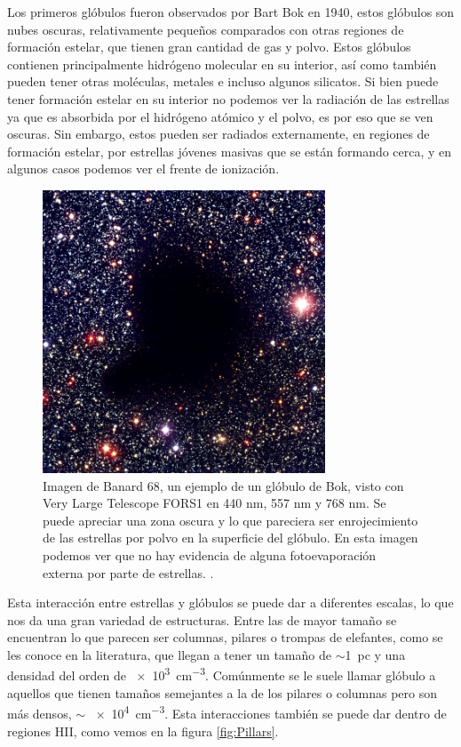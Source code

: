 \documentclass{book}
\begin{document}
Los primeros glóbulos fueron observados por Bart Bok en 1940, estos glóbulos son nubes oscuras, relativamente pequeños comparados con otras regiones de formación estelar, que tienen gran cantidad de gas y polvo. Estos glóbulos contienen principalmente hidrógeno molecular en su interior, así como también pueden tener otras moléculas, metales e incluso algunos silicatos. Si bien puede tener formación estelar en su interior no podemos ver la radiación de las estrellas ya que es absorbida por el hidrógeno atómico y el polvo, es por eso que se ven oscuras. Sin embargo, estos pueden ser radiados externamente, en regiones de formación estelar, por estrellas jóvenes masivas que se están formando cerca, y en algunos casos podemos ver el frente de ionización.

\begin{figure}[h!]
    \centering
    \includegraphics[width=0.75\textwidth]{images Chapter 1/C1_Bok_globule.jpg}
    \caption{Imagen de Banard 68, un ejemplo de un glóbulo de Bok, visto con Very Large Telescope FORS1 en 440 nm, 557 nm y 768 nm. Se puede apreciar una zona oscura y lo que pareciera ser enrojecimiento de las estrellas por polvo en la superficie del glóbulo. En esta imagen podemos ver que no hay evidencia de alguna fotoevaporación externa por parte de estrellas. \citep{Alves:2001}.}
    \label{fig:Banard}
\end{figure}

Esta interacción entre estrellas y glóbulos se puede dar a diferentes escalas, lo que nos da una gran variedad de estructuras. Entre las de mayor tamaño se encuentran lo que parecen ser columnas, pilares o trompas de elefantes, como se les conoce en la literatura, que llegan a tener un tamaño de $\sim$\SI{1}{pc} y una densidad del orden de \SI{e3}{cm^{-3}}. Comúnmente se le suele llamar glóbulo a aquellos que tienen tamaños semejantes a la de los pilares o columnas pero son más densos, $\sim$ \SI{e4}{cm^{-3}}. Esta interacciones también se puede dar dentro de regiones HII, como vemos en la figura \ref{fig:Pillars}.
\end{document}
